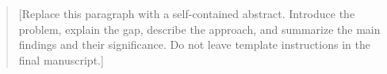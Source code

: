 \begin{abstract}
[Replace this paragraph with a self-contained abstract. Introduce the problem,
explain the gap, describe the approach, and summarize the main findings and
their significance. Do not leave template instructions in the final manuscript.]
\end{abstract}
